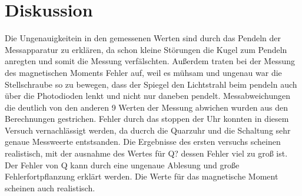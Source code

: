 \newpage
\section{Diskussion}
\label{sec:Diskussion}
Die Ungenauigkeitein in den gemessenen Werten sind durch das Pendeln der Messapparatur zu erklären, da schon kleine Störungen die Kugel zum Pendeln anregten und somit die Messung verfälschten.
Außerdem traten bei der Messung des magnetischen Moments Fehler auf, weil es mühsam und ungenau war die Stellschraube so zu bewegen, dass der Spiegel den Lichtstrahl beim pendeln auch über die Photodioden lenkt und nicht nur daneben pendelt.
Messabweichungen die deutlich von den anderen 9 Werten der Messung abwichen wurden aus den Berechnungen gestrichen.
Fehler durch das stoppen der Uhr konnten in diesem Versuch vernachlässigt werden, da ducrch die Quarzuhr und die Schaltung sehr genaue Messweerte entstsanden.
Die Ergebnisse des ersten versuchs scheinen realistisch, mit der ausnahme des Wertes für Q? dessen Fehler viel zu groß ist.
Der Fehler von Q kann durch eine ungenaue Ablesung und große Fehlerfortpflanzung erklärt werden.
Die Werte für das magnetische Moment scheinen auch realistisch.
